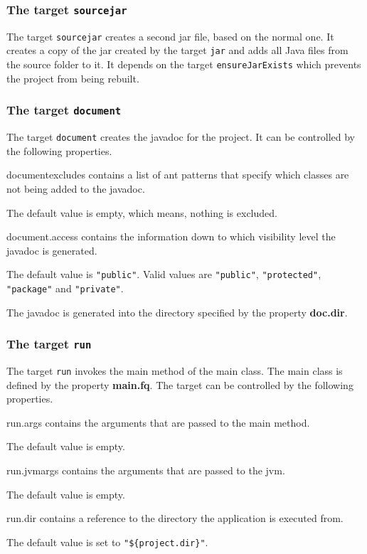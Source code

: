 \documentclass[a4paper,twoside,11pt,bibtotoc]{article}
\begin{document}
\subsubsection{The target \texttt{sourcejar}}
The target \texttt{sourcejar} creates a second jar file, based on the normal one.
It creates a copy of the jar created by the target \texttt{jar} and adds all Java files from the source folder to it.
It depends on the target \texttt{ensureJarExists} which prevents the project from being rebuilt.

\subsubsection*{The target \texttt{document}}
The target \texttt{document} creates the javadoc for the project.
It can be controlled by the following properties.
\begin{description*}
	\item[documentexcludes] contains a list of ant patterns that specify which classes are not being added to the javadoc.\par The default value is empty, which means, nothing is excluded.
	\item[document.access] contains the information down to which visibility level the javadoc is generated.\par The default value is \texttt{"public"}. Valid values are \texttt{"public"}, \texttt{"protected"}, \texttt{"package"} and \texttt{"private"}.
\end{description*}

The javadoc is generated into the directory specified by the property \textbf{doc.dir}.

\subsubsection*{The target \texttt{run}}
The target \texttt{run} invokes the main method of the main class.
The main class is defined by the property \textbf{main.fq}.
The target can be controlled by the following properties.

\begin{description*}
	\item[run.args] contains the arguments that are passed to the main method.\par The default value is empty.
	\item[run.jvmargs] contains the arguments that are passed to the jvm.\par The default value is empty.
	\item[run.dir] contains a reference to the directory the application is executed from.\par The default value is set to \texttt{"\$\{project.dir\}"}.
\end{description*}
\end{document}
